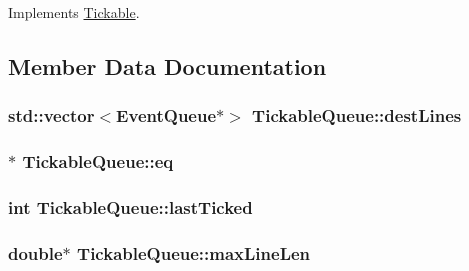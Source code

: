 Implements \hyperlink{class_tickable_ac65be54f32d39d1450a37cf4acb1ad15}{Tickable}.



\subsection{Member Data Documentation}
\subsubsection[{\texorpdfstring{dest\+Lines}{destLines}}]{\setlength{\rightskip}{0pt plus 5cm}std\+::vector$<${\bf Event\+Queue}$\ast$$>$ Tickable\+Queue\+::dest\+Lines\hspace{0.3cm}{\ttfamily [private]}}\hypertarget{class_tickable_queue_a44b1ef6bc662fc500030f35a4f10e73a}{}\label{class_tickable_queue_a44b1ef6bc662fc500030f35a4f10e73a}
\subsubsection[{\texorpdfstring{eq}{eq}}]{$\ast$ Tickable\+Queue\+::eq\hspace{0.3cm}{\ttfamily [private]}}\hypertarget{class_tickable_queue_ad14bee370bdfb8db2550fa3fd7a11a3a}{}\label{class_tickable_queue_ad14bee370bdfb8db2550fa3fd7a11a3a}
\subsubsection[{\texorpdfstring{last\+Ticked}{lastTicked}}]{\setlength{\rightskip}{0pt plus 5cm}int Tickable\+Queue\+::last\+Ticked\hspace{0.3cm}{\ttfamily [private]}}\hypertarget{class_tickable_queue_a1bab2d5f40fb2a9f8ba171239843f422}{}\label{class_tickable_queue_a1bab2d5f40fb2a9f8ba171239843f422}
\subsubsection[{\texorpdfstring{max\+Line\+Len}{maxLineLen}}]{\setlength{\rightskip}{0pt plus 5cm}double$\ast$ Tickable\+Queue\+::max\+Line\+Len\hspace{0.3cm}{\ttfamily [private]}}\hypertarget{class_tickable_queue_a86b7e60ef45f0405279725058820f4a8}{}\label{class_tickable_queue_a86b7e60ef45f0405279725058820f4a8}
